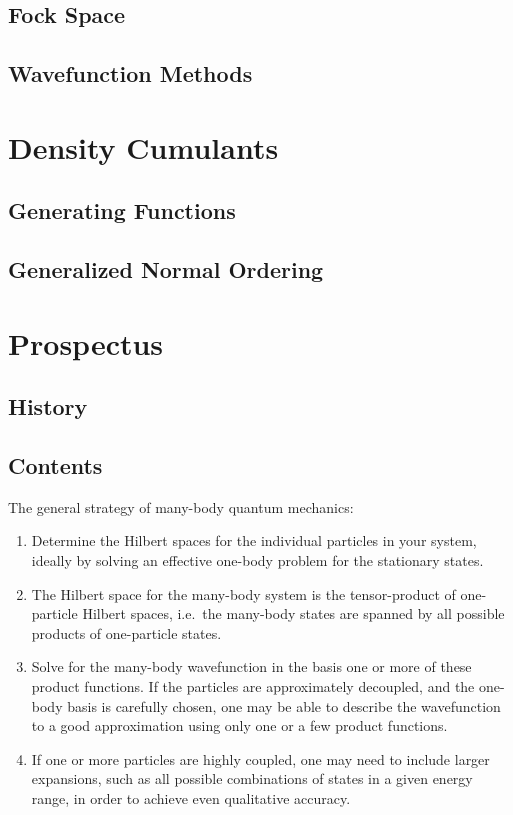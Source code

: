 \subsection{Fock Space}

\subsection{Wavefunction Methods}

\section{Density Cumulants}

\subsection{Generating Functions}

\subsection{Generalized Normal Ordering}

\section{Prospectus}

\subsection{History}

\subsection{Contents}



The general strategy of many-body quantum mechanics:
\begin{enumerate}
    \item
        Determine the Hilbert spaces for the individual particles in your
        system, ideally by solving an effective one-body problem for the
        stationary states.
    \item
        The Hilbert space for the many-body system is the tensor-product of
        one-particle Hilbert spaces, i.e.~the many-body states are spanned by
        all possible products of one-particle states.
    \item
        Solve for the many-body wavefunction in the basis one or more of these
        product functions.
        If the particles are approximately decoupled, and the one-body basis is
        carefully chosen, one may be able to describe the wavefunction to a good
        approximation using only one or a few product functions.
    \item
        If one or more particles are highly coupled, one may need to include
        larger expansions, such as all possible combinations of states in a
        given energy range, in order to achieve even qualitative accuracy.
\end{enumerate}

